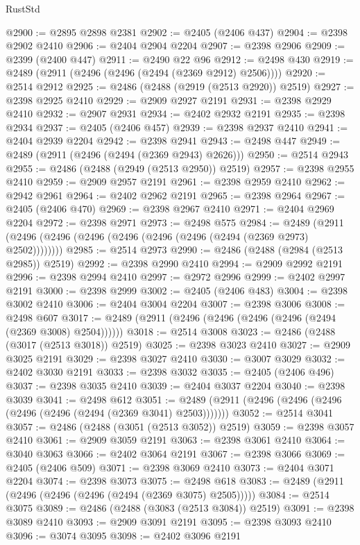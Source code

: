 \begin{lexlean}{RustStd}
\begin{coremodule}
@2900 := @2895 @2898 @2381
@2902 := @2405 (@2406 @437)
@2904 := @2398 @2902 @2410
@2906 := @2404 @2904 @2204
@2907 := @2398 @2906
@2909 := @2399 (@2400 @447)
@2911 := @2490 @22 @96
@2912 := @2498 @430
@2919 := @2489 (@2911 (@2496 (@2496 (@2494 (@2369 @2912) @2506))))
@2920 := @2514 @2912
@2925 := @2486 (@2488 (@2919 (@2513 @2920)) @2519)
@2927 := @2398 @2925 @2410
@2929 := @2909 @2927 @2191
@2931 := @2398 @2929 @2410
@2932 := @2907 @2931
@2934 := @2402 @2932 @2191
@2935 := @2398 @2934
@2937 := @2405 (@2406 @457)
@2939 := @2398 @2937 @2410
@2941 := @2404 @2939 @2204
@2942 := @2398 @2941
@2943 := @2498 @447
@2949 := @2489 (@2911 (@2496 (@2494 (@2369 @2943) @2626)))
@2950 := @2514 @2943
@2955 := @2486 (@2488 (@2949 (@2513 @2950)) @2519)
@2957 := @2398 @2955 @2410
@2959 := @2909 @2957 @2191
@2961 := @2398 @2959 @2410
@2962 := @2942 @2961
@2964 := @2402 @2962 @2191
@2965 := @2398 @2964
@2967 := @2405 (@2406 @470)
@2969 := @2398 @2967 @2410
@2971 := @2404 @2969 @2204
@2972 := @2398 @2971
@2973 := @2498 @575
@2984 := @2489 (@2911 (@2496 (@2496 (@2496 (@2496 (@2496 (@2496 (@2494 (@2369 @2973) @2502))))))))
@2985 := @2514 @2973
@2990 := @2486 (@2488 (@2984 (@2513 @2985)) @2519)
@2992 := @2398 @2990 @2410
@2994 := @2909 @2992 @2191
@2996 := @2398 @2994 @2410
@2997 := @2972 @2996
@2999 := @2402 @2997 @2191
@3000 := @2398 @2999
@3002 := @2405 (@2406 @483)
@3004 := @2398 @3002 @2410
@3006 := @2404 @3004 @2204
@3007 := @2398 @3006
@3008 := @2498 @607
@3017 := @2489 (@2911 (@2496 (@2496 (@2496 (@2496 (@2494 (@2369 @3008) @2504))))))
@3018 := @2514 @3008
@3023 := @2486 (@2488 (@3017 (@2513 @3018)) @2519)
@3025 := @2398 @3023 @2410
@3027 := @2909 @3025 @2191
@3029 := @2398 @3027 @2410
@3030 := @3007 @3029
@3032 := @2402 @3030 @2191
@3033 := @2398 @3032
@3035 := @2405 (@2406 @496)
@3037 := @2398 @3035 @2410
@3039 := @2404 @3037 @2204
@3040 := @2398 @3039
@3041 := @2498 @612
@3051 := @2489 (@2911 (@2496 (@2496 (@2496 (@2496 (@2496 (@2494 (@2369 @3041) @2503)))))))
@3052 := @2514 @3041
@3057 := @2486 (@2488 (@3051 (@2513 @3052)) @2519)
@3059 := @2398 @3057 @2410
@3061 := @2909 @3059 @2191
@3063 := @2398 @3061 @2410
@3064 := @3040 @3063
@3066 := @2402 @3064 @2191
@3067 := @2398 @3066
@3069 := @2405 (@2406 @509)
@3071 := @2398 @3069 @2410
@3073 := @2404 @3071 @2204
@3074 := @2398 @3073
@3075 := @2498 @618
@3083 := @2489 (@2911 (@2496 (@2496 (@2496 (@2494 (@2369 @3075) @2505)))))
@3084 := @2514 @3075
@3089 := @2486 (@2488 (@3083 (@2513 @3084)) @2519)
@3091 := @2398 @3089 @2410
@3093 := @2909 @3091 @2191
@3095 := @2398 @3093 @2410
@3096 := @3074 @3095
@3098 := @2402 @3096 @2191

\end{coremodule}
\end{lexlean}
